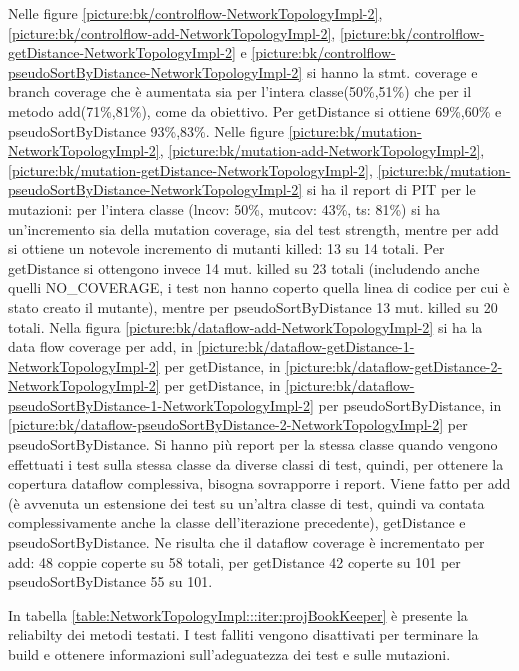 \documentclass[10pt, a4paper]{article}
\newcommand{\gettablelabel}[5]{table:#1:#2:#3:iter#4:proj#5}
\newcommand{\getreltablelabel}[2]{\gettablelabel{#1}{}{}{}{#2}}
\newcommand{\getpicturelabel}[1]{picture:#1}
\def\bookkeeper{BookKeeper}
\begin{document}
	Nelle figure \ref{\getpicturelabel{bk/controlflow-NetworkTopologyImpl-2}}, \ref{\getpicturelabel{bk/controlflow-add-NetworkTopologyImpl-2}}, \ref{\getpicturelabel{bk/controlflow-getDistance-NetworkTopologyImpl-2}} e \ref{\getpicturelabel{bk/controlflow-pseudoSortByDistance-NetworkTopologyImpl-2}} si hanno la stmt. coverage e branch coverage che è aumentata sia per l'intera classe(50\%,51\%) che per il metodo add(71\%,81\%), come da obiettivo.
	Per getDistance si ottiene 69\%,60\% e pseudoSortByDistance 93\%,83\%.
	Nelle figure \ref{\getpicturelabel{bk/mutation-NetworkTopologyImpl-2}}, 
	\ref{\getpicturelabel{bk/mutation-add-NetworkTopologyImpl-2}},
	\ref{\getpicturelabel{bk/mutation-getDistance-NetworkTopologyImpl-2}},
	\ref{\getpicturelabel{bk/mutation-pseudoSortByDistance-NetworkTopologyImpl-2}} si ha il report di PIT per
	le mutazioni: per l'intera classe (lncov: 50\%, mutcov: 43\%, ts: 81\%) si ha un'incremento sia della mutation coverage, sia del test strength,
	mentre per add si ottiene un notevole incremento di mutanti killed: 13 su 14 totali.
	Per getDistance si ottengono invece 14 mut. killed su 23 totali (includendo anche quelli
	NO\_COVERAGE, i test non hanno coperto quella linea di codice per cui è stato creato il mutante), mentre per
	pseudoSortByDistance 13 mut. killed su 20 totali.
	Nella figura \ref{\getpicturelabel{bk/dataflow-add-NetworkTopologyImpl-2}} si ha la data flow coverage per add,
	in \ref{\getpicturelabel{bk/dataflow-getDistance-1-NetworkTopologyImpl-2}} per getDistance,
	in \ref{\getpicturelabel{bk/dataflow-getDistance-2-NetworkTopologyImpl-2}} per getDistance,
	in \ref{\getpicturelabel{bk/dataflow-pseudoSortByDistance-1-NetworkTopologyImpl-2}} per pseudoSortByDistance,
	in \ref{\getpicturelabel{bk/dataflow-pseudoSortByDistance-2-NetworkTopologyImpl-2}} per pseudoSortByDistance.
	Si hanno più report per la stessa classe quando vengono effettuati i test sulla stessa classe da diverse classi
	di test, quindi, per ottenere la copertura dataflow complessiva, bisogna sovrapporre i report. Viene fatto 
	per add (è avvenuta un estensione dei test su un'altra classe di test, quindi va contata complessivamente anche
	la classe dell'iterazione precedente), getDistance e pseudoSortByDistance.
	Ne risulta che il dataflow coverage è incrementato per add: 48 coppie coperte su 58 totali, per
	getDistance 42 coperte su 101 per pseudoSortByDistance 55 su 101.
	
	In tabella \ref{\getreltablelabel{NetworkTopologyImpl}{\bookkeeper}} è
	presente la reliabilty dei metodi testati. I test falliti vengono disattivati
	per terminare la build e ottenere informazioni sull'adeguatezza dei test e
	sulle mutazioni.
\end{document}
